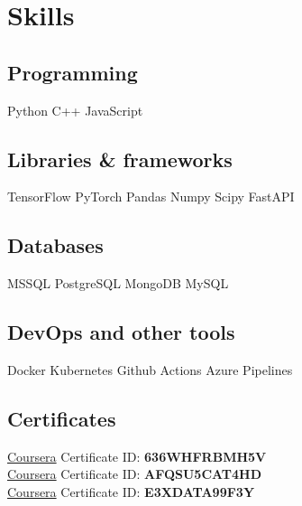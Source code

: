 \documentclass[]{deedy-resume-openfont}
\begin{document}
\sectionsep

\section{Skills}
\begin{minipage}[t]{.6\textwidth}
\subsection{Programming}
Python \textbullet{}   C++ \textbullet{} JavaScript
\subsection{Libraries \& frameworks}
TensorFlow \textbullet{} PyTorch \textbullet{} Pandas \textbullet{} Numpy \textbullet{} Scipy \textbullet{} FastAPI
\subsection{Databases}
MSSQL \textbullet{} PostgreSQL \textbullet{} MongoDB \textbullet{} MySQL
\subsection{DevOps and other tools}
Docker \textbullet{} Kubernetes \textbullet{} Github Actions \textbullet{} Azure Pipelines
\sectionsep
\end{minipage}

\sectionsep

\subsection{Certificates}
\href{https://www.coursera.org/account/accomplishments/verify/636WHFRBMH5V}{\faCertificate\; Coursera} \textbullet{} Certificate ID: \textbf{636WHFRBMH5V}
\vspace{\topsep}\\
\href{https://www.coursera.org/account/accomplishments/verify/AFQSU5CAT4HD}{\faCertificate\; Coursera} \textbullet{} Certificate ID: \textbf{AFQSU5CAT4HD}
\vspace{\topsep}\\
\href{https://www.coursera.org/account/accomplishments/verify/E3XDATA99F3Y}{\faCertificate\; Coursera} \textbullet{} Certificate ID: \textbf{E3XDATA99F3Y}


\end{document}

